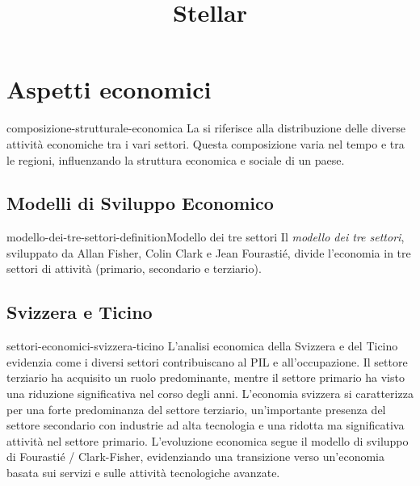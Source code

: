 \documentclass[preview]{standalone}
\begin{document}
\title{Stellar}
\genpage

\section{Aspetti economici}

\begin{snippet}{composizione-strutturale-economica}
    La  si riferisce alla distribuzione delle diverse attività
    economiche tra i vari settori. Questa composizione varia nel tempo e tra le regioni, influenzando la
    struttura economica e sociale di un paese.
\end{snippet}

\subsection{Modelli di Sviluppo Economico}

\begin{snippetdefinition}{modello-dei-tre-settori-definition}{Modello dei tre settori}
    Il \textit{modello dei tre settori}, sviluppato da Allan Fisher, Colin Clark e Jean Fourastié,
    divide l'economia in tre settori di attività (primario, secondario e terziario).
\end{snippetdefinition}


\subsection{Svizzera e Ticino}

\begin{snippet}{settori-economici-svizzera-ticino}
    L'analisi economica della Svizzera e del Ticino evidenzia come i diversi settori
    contribuiscano al PIL e all'occupazione. Il settore terziario ha acquisito un ruolo
    predominante, mentre il settore primario ha visto una riduzione significativa nel corso degli
    anni.
    L'economia svizzera si caratterizza per una forte predominanza del settore terziario, un'importante
    presenza del settore secondario con industrie ad alta tecnologia e una ridotta ma significativa
    attività nel settore primario. L'evoluzione economica segue il modello di sviluppo di Fourastié /
    Clark-Fisher, evidenziando una transizione verso un'economia basata sui servizi e sulle attività
    tecnologiche avanzate.
\end{snippet}
\end{document}
